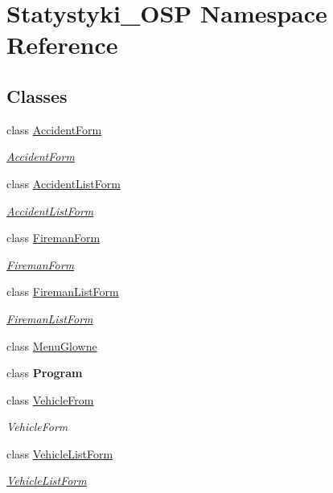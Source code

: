 \hypertarget{namespace_statystyki___o_s_p}{}\section{Statystyki\+\_\+\+O\+SP Namespace Reference}
\label{namespace_statystyki___o_s_p}
\subsection*{Classes}
\begin{DoxyCompactItemize}
\item 
class \mbox{\hyperlink{class_statystyki___o_s_p_1_1_accident_form}{Accident\+Form}}
\begin{DoxyCompactList}\small\item\em \mbox{\hyperlink{class_statystyki___o_s_p_1_1_accident_form}{Accident\+Form}} \end{DoxyCompactList}\item 
class \mbox{\hyperlink{class_statystyki___o_s_p_1_1_accident_list_form}{Accident\+List\+Form}}
\begin{DoxyCompactList}\small\item\em \mbox{\hyperlink{class_statystyki___o_s_p_1_1_accident_list_form}{Accident\+List\+Form}} \end{DoxyCompactList}\item 
class \mbox{\hyperlink{class_statystyki___o_s_p_1_1_fireman_form}{Fireman\+Form}}
\begin{DoxyCompactList}\small\item\em \mbox{\hyperlink{class_statystyki___o_s_p_1_1_fireman_form}{Fireman\+Form}} \end{DoxyCompactList}\item 
class \mbox{\hyperlink{class_statystyki___o_s_p_1_1_fireman_list_form}{Fireman\+List\+Form}}
\begin{DoxyCompactList}\small\item\em \mbox{\hyperlink{class_statystyki___o_s_p_1_1_fireman_list_form}{Fireman\+List\+Form}} \end{DoxyCompactList}\item 
class \mbox{\hyperlink{class_statystyki___o_s_p_1_1_menu_glowne}{Menu\+Glowne}}
\item 
class {\bfseries Program}
\item 
class \mbox{\hyperlink{class_statystyki___o_s_p_1_1_vehicle_from}{Vehicle\+From}}
\begin{DoxyCompactList}\small\item\em Vehicle\+Form \end{DoxyCompactList}\item 
class \mbox{\hyperlink{class_statystyki___o_s_p_1_1_vehicle_list_form}{Vehicle\+List\+Form}}
\begin{DoxyCompactList}\small\item\em \mbox{\hyperlink{class_statystyki___o_s_p_1_1_vehicle_list_form}{Vehicle\+List\+Form}} \end{DoxyCompactList}\end{DoxyCompactItemize}
